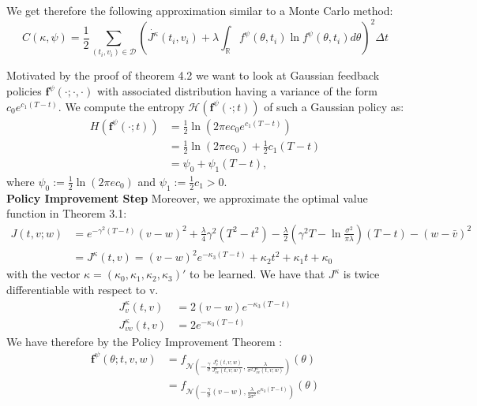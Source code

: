 \documentclass[oneside, a4paper, onecolumn, 11pt]{article}
\begin{document}
We get therefore the following approximation similar to a Monte Carlo method: 
\begin{equation}
     C(\kappa, \psi) = \frac{1}{2}\sum_{(t_i,v_i) \in \mathcal{D}}\left(\dot{J^\kappa}(t_i, v_i) + \lambda\int_\mathbb{R}f^\psi(\theta,t_i) \ln f^\psi(\theta,t_i) d\theta\right)^2 \Delta t \label{bellman_error_param}
\end{equation} 

Motivated by the proof of theorem 4.2 we want to look at Gaussian feedback policies $\boldsymbol{f}^{\psi}(\cdot;\cdot,\cdot)$ with associated distribution having a variance of the form $c_0 e^{c_1(T-t)}$. 
We compute the entropy $\mathcal{H}(\boldsymbol{f}^\psi(\cdot; t))$ of such a Gaussian policy as: 
\begin{align*}
    H(\boldsymbol{f}^{\psi}(\cdot;t)) &= \frac{1}{2}\ln\left(2\pi e c_0 e^{c_1(T-t)}\right)\\ 
    &= \frac{1}{2}\ln(2\pi e c_0) + \frac{1}{2}c_1(T-t)\\
    &= \psi_0 + \psi_1(T-t),
\end{align*}
where $\psi_0 := \frac{1}{2}\ln(2\pi e c_0)$ and $\psi_1 := \frac{1}{2}c_1 > 0$.
\newline
\\\textbf{Policy Improvement Step}
Moreover, we approximate the optimal value function in  Theorem 3.1:  
\begin{align*}
J(t,v;w) &= e^{-\gamma^2(T-t)}(v-w)^2 + \frac{\lambda}{4}\gamma^2 (T^2-t^2) - \frac{\lambda}{2} \left( \gamma^2T - \ln \frac{\sigma^2}{\pi \lambda} \right)(T-t) - (w- \bar{v})^2 \\
&= J^\kappa(t,v) = (v-w)^2 e^{-\kappa_3(T-t)} + \kappa_2 t^2 + \kappa_1t + \kappa_0 
\end{align*}
 with the vector $\kappa = (\kappa_0, \kappa_1, \kappa_2, \kappa_3)'$ to be learned.
We have that $J^\kappa$ is twice differentiable with respect to v.
\begin{align*}
    J^\kappa_v (t,v) &= 2(v-w)e^{-\kappa_3(T-t)}\\
    J^\kappa_{vv}(t,v) &= 2e^{-\kappa_3(T-t)}
\end{align*}
We have therefore by the Policy Improvement Theorem :
\begin{align}
     \boldsymbol{f}^{\psi}(\theta; t, v,w) &= f_{\mathcal{N}\left( -\frac{\gamma}{\sigma} \frac{J^{\kappa}_v(t,v;w)}{J^{\kappa}_{vv}(t,v;w)}, \frac{\lambda}{\sigma^2J^{\kappa}_{vv}(t,v;w)} \right)}(\theta)  \\ 
   &= f_{\mathcal{N}\left(-\frac{\gamma}{\sigma}(v-w), \frac{\lambda}{2\sigma^2} e^{\kappa_3(T-t)}\right)}(\theta) \label{parametrized_policy_improved}
\end{align}
   
\end{document}
